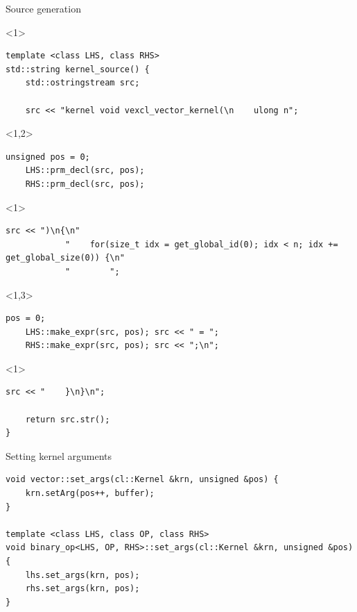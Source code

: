 \documentclass[@BEAMER_OPTIONS@]{beamer}
\begin{document}
\begin{frame}[fragile]{Source generation}
    \begin{exampleblock}{}
        \begin{uncoverenv}<1>
            \begin{lstlisting}
template <class LHS, class RHS>
std::string kernel_source() {
    std::ostringstream src;

    src << "kernel void vexcl_vector_kernel(\n    ulong n";
            \end{lstlisting}
        \end{uncoverenv}
        \begin{uncoverenv}<1,2>
            \begin{lstlisting}[firstnumber=last]
    unsigned pos = 0;
    LHS::prm_decl(src, pos);
    RHS::prm_decl(src, pos);
            \end{lstlisting}
        \end{uncoverenv}
        \begin{uncoverenv}<1>
            \begin{lstlisting}[firstnumber=last]
    src << ")\n{\n"
            "    for(size_t idx = get_global_id(0); idx < n; idx += get_global_size(0)) {\n"
            "        ";
            \end{lstlisting}
        \end{uncoverenv}
        \begin{uncoverenv}<1,3>
            \begin{lstlisting}[firstnumber=last]
    pos = 0;
    LHS::make_expr(src, pos); src << " = ";
    RHS::make_expr(src, pos); src << ";\n";
            \end{lstlisting}
        \end{uncoverenv}
        \begin{uncoverenv}<1>
            \begin{lstlisting}[firstnumber=last]
    src << "    }\n}\n";

    return src.str();
}
            \end{lstlisting}
        \end{uncoverenv}
    \end{exampleblock}
\end{frame}

\note{ }

\begin{frame}[fragile]{Setting kernel arguments}
    \begin{exampleblock}{}
        \begin{lstlisting}
void vector::set_args(cl::Kernel &krn, unsigned &pos) {
    krn.setArg(pos++, buffer);
}

template <class LHS, class OP, class RHS>
void binary_op<LHS, OP, RHS>::set_args(cl::Kernel &krn, unsigned &pos) {
    lhs.set_args(krn, pos);
    rhs.set_args(krn, pos);
}
        \end{lstlisting}
    \end{exampleblock}
\end{frame}
\end{document}
